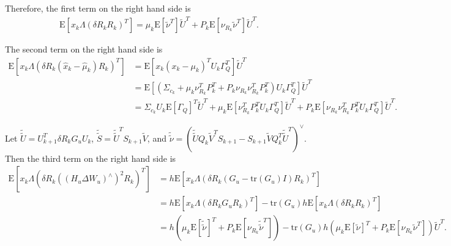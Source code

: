 \documentclass[10pt]{article}
\newcommand{\tr}[1]{\ensuremath{\mathrm{tr}\left( #1 \right)}}
\newcommand{\expect}[1]{\ensuremath{\mathrm{E}\left[ #1 \right]}}
\begin{document}
\noindent Therefore, the first term on the right hand side is
\begin{align*}
	\expect{x_k\Lambda(\delta R_kR_k)^T} = \mu_k\expect{\tilde{\nu}^T}\tilde{U}^T + P_k\expect{\nu_{R_k}\tilde{\nu}^T}\tilde{U}^T.
\end{align*}

\noindent The second term on the right hand side is
\begin{align*}
	\expect{x_k\Lambda(\delta R_k(\hat{x}_k-\hat{\mu}_k)R_k)^T} &= \expect{x_k(x_k-\mu_k)^TU_k\Gamma_Q^T}\tilde{U}^T \\
	&= \expect{(\Sigma_{c_k} + \mu_k\nu_{R_k}^TP_k^T + P_k\nu_{R_k}\nu_{R_k}^TP_k^T)U_k\Gamma_Q^T} \tilde{U}^T \\
	&= \Sigma_{c_k}U_k\expect{\Gamma_Q}^T\tilde{U}^T + \mu_k\expect{\nu_{R_k}^TP_k^TU_k\Gamma_Q^T}\tilde{U}^T + P_k\expect{\nu_{R_k}\nu_{R_k}^TP_k^TU_k\Gamma_Q^T}\tilde{U}^T.
\end{align*}

\noindent Let $\tilde{\tilde{U}} = U_{k+1}^T\delta R_kG_uU_k$, $\tilde{\tilde{S}} = \tilde{\tilde{U}}^TS_{k+1}\tilde{V}$, and $\tilde{\tilde{\nu}} = (\tilde{\tilde{U}}Q_k\tilde{V}^TS_{k+1} - S_{k+1}\tilde{V}Q_k^T\tilde{\tilde{U}}^T)^\vee$.
Then the third term on the right hand side is
\begin{align*}
	\expect{x_k\Lambda\left( \delta R_k((H_u\Delta W_u)^\wedge)^2 R_k \right)^T} &= h\expect{x_k\Lambda\left( \delta R_k(G_u-\tr{G_u}I)R_k \right)^T} \\
	&= h\expect{x_k\Lambda(\delta R_kG_uR_k)^T} - \tr{G_u}h\expect{x_k\Lambda(\delta R_kR_k)^T} \\
	&= h\left( \mu_k\expect{\tilde{\tilde{\nu}}}^T + P_k\expect{\nu_{R_k}\tilde{\tilde{\nu}}^T} \right) - \tr{G_u}h\left( \mu_k\expect{\tilde{\nu}}^T + P_k\expect{\nu_{R_k}\tilde{\nu}^T} \right)\tilde{U}^T.
\end{align*}
\end{document}
